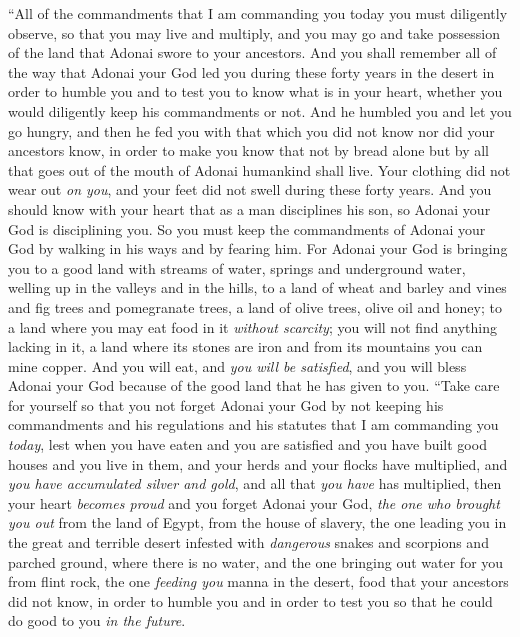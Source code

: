 \begin{biblechapter} %
\verse “All of the commandments that I am commanding you today you must diligently observe, so that you may live and multiply, and you may go and take possession of the land that Adonai swore to your ancestors.
\verse And you shall remember all of the way that Adonai your God led you during these forty years in the desert in order to humble you and to test you to know what is in your heart, whether you would diligently keep his commandments or not.
\verse And he humbled you and let you go hungry, and then he fed you with that which you did not know nor did your ancestors know, in order to make you know that not by bread alone but by all that goes out of the mouth of Adonai humankind shall live.
\verse Your clothing did not wear out \textit{on you}, and your feet did not swell during these forty years.
\verse And you should know with your heart that as a man disciplines his son, so Adonai your God is disciplining you.
\verse So you must keep the commandments of Adonai your God by walking in his ways and by fearing him.
\verse For Adonai your God is bringing you to a good land with streams of water, springs and underground water, welling up in the valleys and in the hills,
\verse to a land of wheat and barley and vines and fig trees and pomegranate trees, a land of olive trees, olive oil and honey;
\verse to a land where you may eat food in it \textit{without scarcity}; you will not find anything lacking in it, a land where its stones are iron and from its mountains you can mine copper.
\verse And you will eat, and \textit{you will be satisfied}, and you will bless Adonai your God because of the good land that he has given to you.
\verse “Take care for yourself so that you not forget Adonai your God by not keeping his commandments and his regulations and his statutes that I am commanding you \textit{today},
\verse lest when you have eaten and you are satisfied and you have built good houses and you live in them,
\verse and your herds and your flocks have multiplied, and \textit{you have accumulated silver and gold}, and all that \textit{you have} has multiplied,
\verse then your heart \textit{becomes proud} and you forget Adonai your God, \textit{the one who brought you out} from the land of Egypt, from the house of slavery,
\verse the one leading you in the great and terrible desert infested with \textit{dangerous} snakes and scorpions and parched ground, where there is no water, and the one bringing out water for you from flint rock,
\verse the one \textit{feeding you} manna in the desert, food that your ancestors did not know, in order to humble you and in order to test you so that he could do good to you \textit{in the future}.

\end{biblechapter}
